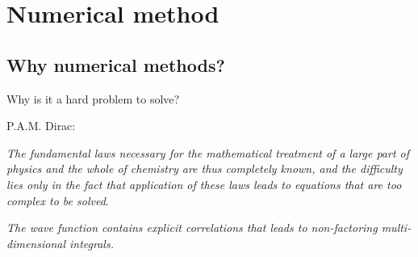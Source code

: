 \section{Numerical method}
\subsection{Why numerical methods?}

\begin{frame}{Why is it a hard problem to solve?}
  \begin{alertblock}{P.A.M. Dirac:}
    \begin{scriptsize}
    \emph{The fundamental laws necessary for the 
    mathematical treatment of a large part of physics and the 
    whole of chemistry are thus completely known, and the 
    difficulty lies only in the fact that application of these laws 
    leads to equations that are too complex to be solved}. 
    \end{scriptsize}
  \end{alertblock}
  
  \begin{scriptsize}
    


        \begin{table}[hbtp]
          \begin{center} 
          \end{center}
          \caption{\footnotesize{Nature of the terms in the Hamiltonian.}}
        \end{table}
    \end{scriptsize}
  \emph{The wave function contains explicit correlations that leads to non-factoring multi-dimensional integrals.}
  

\end{frame}
